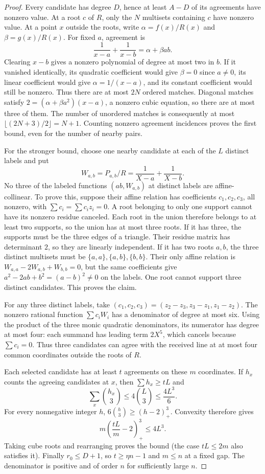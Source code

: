 \begin{proof}
Every candidate has degree $D$, hence at least $A-D$ of its
agreements have nonzero value. At a root $c$ of $R$, only the $N$
multisets containing $c$ have nonzero value. At a point $x$ outside
the roots, write $\alpha=f(x)/R(x)$ and $\beta=g(x)/R(x)$. For
fixed $a$, agreement is
\[
 \frac1{x-a}+\frac1{x-b}=\alpha+\beta ab.
\]
Clearing $x-b$ gives a nonzero polynomial of degree at most two
in $b$. If it vanished identically, its quadratic coefficient
would give $\beta=0$ since $a\ne0$, its linear coefficient would
give $\alpha=1/(x-a)$, and its constant coefficient would still
be nonzero. Thus there are at most $2N$ ordered matches. Diagonal
matches satisfy $2=(\alpha+\beta a^2)(x-a)$, a nonzero cubic
equation, so there are at most three of them. The number of
unordered matches is consequently at most
$\lfloor(2N+3)/2\rfloor=N+1$. Counting nonzero agreement incidences
proves the first bound, even for the number of nearby pairs.

For the stronger bound, choose one nearby candidate at each of
the $L$ distinct labels and put
\[
 W_{a,b}=P_{a,b}/R=\frac1{X-a}+\frac1{X-b}.
\]
No three of the labeled functions $(ab,W_{a,b})$ at distinct labels
are affine-collinear. To prove this, suppose their affine relation
has coefficients $c_1,c_2,c_3$, all nonzero, with
$\sum c_i=\sum c_i z_i=0$. A root belonging to only one support
cannot have its nonzero residue canceled. Each root in the union
therefore belongs to at least two supports, so the union has at
most three roots. If it has three, the supports must be the three
edges of a triangle. Their residue matrix has determinant $2$,
so they are linearly independent. If it has two roots $a,b$, the
three distinct multisets must be $\{a,a\},\{a,b\},\{b,b\}$.
Their only affine relation is
$W_{a,a}-2W_{a,b}+W_{b,b}=0$, but the same coefficients give
$a^2-2ab+b^2=(a-b)^2\ne0$ on the labels. One root cannot support
three distinct candidates. This proves the claim.

For any three distinct labels, take
$(c_1,c_2,c_3)=(z_2-z_3,z_3-z_1,z_1-z_2)$.
The nonzero rational function $\sum c_iW_i$ has a denominator of
degree at most six. Using the product of the three monic quadratic
denominators, its numerator has degree at most four: each summand
has leading term $2X^5$, which cancels because $\sum c_i=0$.
Thus three candidates can agree with the received line at at most
four common coordinates outside the roots of $R$.

Each selected candidate has at least $t$ agreements on these $m$
coordinates. If $h_x$ counts the agreeing candidates at $x$, then
$\sum h_x\ge tL$ and
\[
 \sum_x\binom{h_x}{3}\le4\binom L3\le\frac{4L^3}{6}.
\]
For every nonnegative integer $h$,
$6\binom h3\ge(h-2)_+^3$. Convexity therefore gives
\[
 m\left(\frac{tL}{m}-2\right)_+^3\le4L^3.
\]
Taking cube roots and rearranging proves the bound (the case
$tL\le2m$ also satisfies it). Finally $r_0\le D+1$, so
$t\ge\eta n-1$ and $m\le n$ at a fixed gap. The denominator is
positive and of order $n$ for sufficiently large $n$.
\end{proof}

